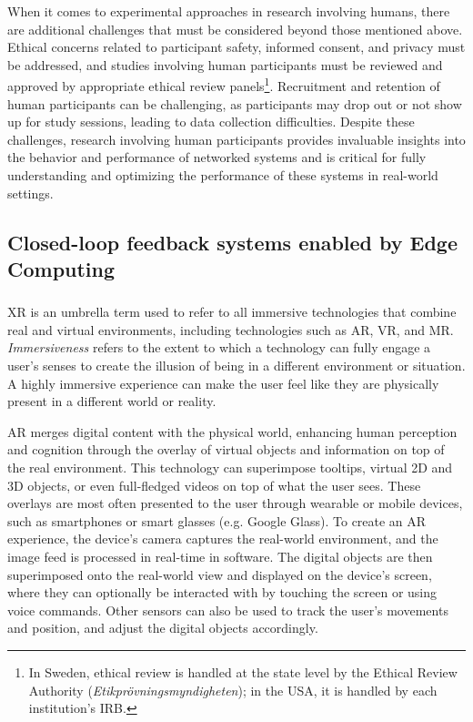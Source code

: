 When it comes to experimental approaches in research involving humans, there are additional challenges that must be considered beyond those mentioned above.
Ethical concerns related to participant safety, informed consent, and privacy must be addressed, and studies involving human participants must be reviewed and approved by appropriate ethical review panels\footnote{%
    In Sweden, ethical review is handled at the state level by the Ethical Review Authority (\emph{Etikprövningsmyndigheten}); in the \acs{USA}, it is handled by each institution's \gls{IRB}.
}.
Recruitment and retention of human participants can be challenging, as participants may drop out or not show up for study sessions, leading to data collection difficulties.
Despite these challenges, research involving human participants provides invaluable insights into the behavior and performance of networked systems and is critical for fully understanding and optimizing the performance of these systems in real-world settings.

\subsection{Closed-loop feedback systems enabled by Edge Computing}


\subsubsection{}\label{background:xr}

\gls{XR} is an umbrella term used to refer to all immersive technologies that combine real and virtual environments, including technologies such as \gls{AR}, \gls{VR}, and \gls{MR}.
\emph{Immersiveness} refers to the extent to which a technology can fully engage a user's senses to create the illusion of being in a different environment or situation.
A highly immersive experience can make the user feel like they are physically present in a different world or reality.

\gls{AR} merges digital content with the physical world, enhancing human perception and cognition through the overlay of virtual objects and information on top of the real environment.
This technology can superimpose tooltips, virtual \gls{2D} and \gls{3D} objects, or even full-fledged videos on top of what the user sees.
These overlays are most often presented to the user through wearable or mobile devices, such as smartphones or smart glasses (e.g. Google Glass).
To create an \gls{AR} experience, the device's camera captures the real-world environment, and the image feed is processed in real-time in software.
The digital objects are then superimposed onto the real-world view and displayed on the device's screen, where they can optionally be interacted with by touching the screen or using voice commands.
Other sensors can also be used to track the user's movements and position, and adjust the digital objects accordingly.


